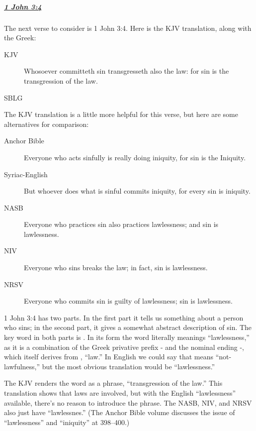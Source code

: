 			\subparagraph{\hyperref[1JOHN-3-4]{1 John 3:4}}
				\label{SIN-1john-3-4}
				
				The next verse to consider is 1 John 3:4.
				Here is the KJV translation,
					along with the Greek:
					
					\begin{description}
						\item[KJV] Whosoever committeth sin transgresseth also the law: for sin is the transgression of the law.
						\item[SBLG] 
					\end{description}
					
				\noindent The KJV translation is a little more helpful for this verse,
					but here are some alternatives for comparison:
					
					\begin{description}
						\item[Anchor Bible] Everyone who acts sinfully is really doing iniquity,
									for sin is the Iniquity.
						\item[Syriac-English] But whoever does what is sinful commits iniquity, for every sin is iniquity.
						\item[NASB] Everyone who practices sin also practices lawlessness; and sin is lawlessness.
						\item[NIV] Everyone who sins breaks the law; in fact, sin is lawlessness.
						\item[NRSV] Everyone who commits sin is guilty of lawlessness; sin is lawlessness.
					\end{description}
					
				1 John 3:4 has two parts.
				In the first part it tells us something about a person who sins;
					in the second part,
						it gives a somewhat abstract description of sin.
				The key word in both parts is .
				In its form the word literally meanings ``lawlessness,''
					as it is a combination of the Greek privative prefix - and the nominal ending -,
						which itself derives from ,
							``law.''
				In English we could say that  means ``not-lawfulness,''
					but the most obvious translation would be ``lawlessness.''
					
				The KJV renders the word as a phrase,
					``transgression of the law.''
				This translation shows that laws are involved,
					but with the English ``lawlessness'' available,
						there's no reason to introduce the phrase.
				The NASB,
					NIV,
						and NRSV also just have ``lawlessnes.''
				(The Anchor Bible volume discusses the issue of ``lawlessness'' and ``iniquity'' at 398--400.)
				
